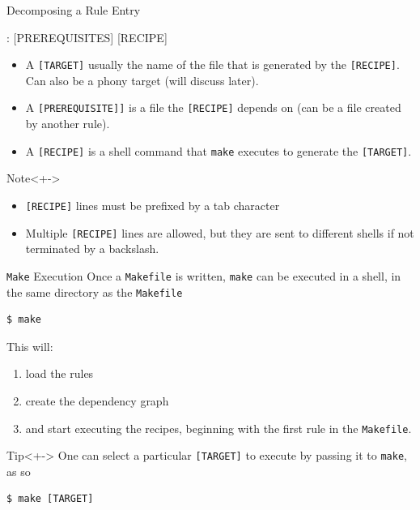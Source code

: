 \documentclass[10pt]{beamer}
\newcommand{\textco}[1]{\colorbox{bg_gray}{\texttt{#1}}}
\begin{document}
\begin{frame}[fragile]{Decomposing a Rule Entry}
\begin{makefile}
[TARGET]: [PREREQUISITES]
    [RECIPE]
\end{makefile}
  \begin{itemize}
    \item<+-> A \textco{[TARGET]} usually the name of the file that is generated by
      the \textco{[RECIPE]}. Can also be a phony target (will discuss later).\\

    \item<+-> A \textco{[PREREQUISITE]]} is a file the \textco{[RECIPE]} depends
      on (can be a file created by another rule).\\

    \item<+-> A \textco{[RECIPE]} is a shell command that \textco{make} executes
      to generate the \textco{[TARGET]}.

  \end{itemize}

  \begin{alertblock}{Note}<+->
    \begin{itemize}
    \item \textco{[RECIPE]} lines must be prefixed by a tab character
    \item Multiple \textco{[RECIPE]} lines are allowed, but they are sent to different shells if
        not terminated by a backslash.
    \end{itemize}
  \end{alertblock}
\end{frame}


\begin{frame}[fragile]{\texttt{Make} Execution}
  Once a \textco{Makefile} is written, \textco{make} can be executed in a shell,
  in the same directory as the \textco{Makefile}
  \begin{lstlisting}
$ make
\end{lstlisting}
  This will:
  \begin{enumerate}[<+->]
  \item load the rules
  \item create the dependency graph
    \item and start executing the
      recipes, beginning with the first rule in the \textco{Makefile}.
    \end{enumerate}

  \begin{exampleblock}{Tip}<+->
  One can select a particular \textco{[TARGET]} to execute by passing it to
  \textco{make}, as so
\begin{lstlisting}
$ make [TARGET]
\end{lstlisting}
\end{exampleblock}

\end{frame}
\end{document}
